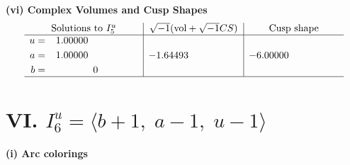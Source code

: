 \documentclass[1p]{elsarticle_modified}
\theoremstyle{definition}
\newcommand{\I}{\sqrt{-1}}
\begin{document}
\newpage\flushleft \textbf{(vi) Complex Volumes and Cusp Shapes}
$$\begin{array}{c|c|c}  
\text{Solutions to }I^u_{5}& \I (\text{vol} + \sqrt{-1}CS) & \text{Cusp shape}\\
 \hline 
\begin{aligned}
u &= \phantom{-}1.00000\phantom{ +0.000000I} \\
a &= \phantom{-}1.00000\phantom{ +0.000000I} \\
b &= \phantom{-0.000000 } 0\end{aligned}
 & -1.64493\phantom{ +0.000000I} & -6.00000\phantom{ +0.000000I}\\
 \hline 
 \end{array}$$\newpage\newpage\renewcommand{\arraystretch}{1}
\centering \section*{VI. $I^u_{6}= \langle b+1,\;a-1,\;u-1 \rangle$}
\flushleft \textbf{(i) Arc colorings}\\
\end{document}
